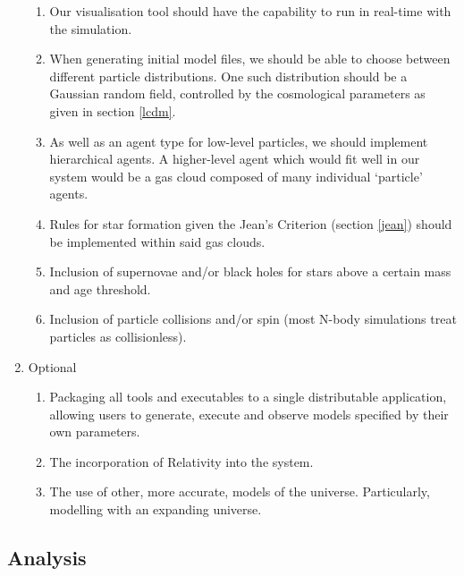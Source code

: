 \documentclass[11pt,a4paper]{article}
\begin{document}
\begin{enumerate}
\begin{enumerate}
    \item Our visualisation tool should have the capability to run in real-time with the simulation.
    \item When generating initial model files, we should be able to choose between different particle distributions. One such distribution should be a Gaussian random field, controlled by the cosmological parameters as given in section \ref{lcdm}. \label{d3}
    \item As well as an agent type for low-level particles, we should implement hierarchical agents. A higher-level agent which would fit well in our system would be a gas cloud composed of many individual `particle' agents.
    \item Rules for star formation given the Jean's Criterion (section \ref{jean}) should be implemented within said gas clouds.
    \item Inclusion of supernovae and/or black holes for stars above a certain mass and age threshold.
    \item Inclusion of particle collisions and/or spin (most N-body simulations treat particles as collisionless).
  \end{enumerate}
  \item{Optional}
  \begin{enumerate}
    \item Packaging all tools and executables to a single distributable application, allowing users to generate, execute and observe models specified by their own parameters.
    \item The incorporation of Relativity into the system.
    \item The use of other, more accurate, models of the universe. Particularly, modelling with an expanding universe.
  \end{enumerate}
\end{enumerate}

\subsection{Analysis}
\end{document}
